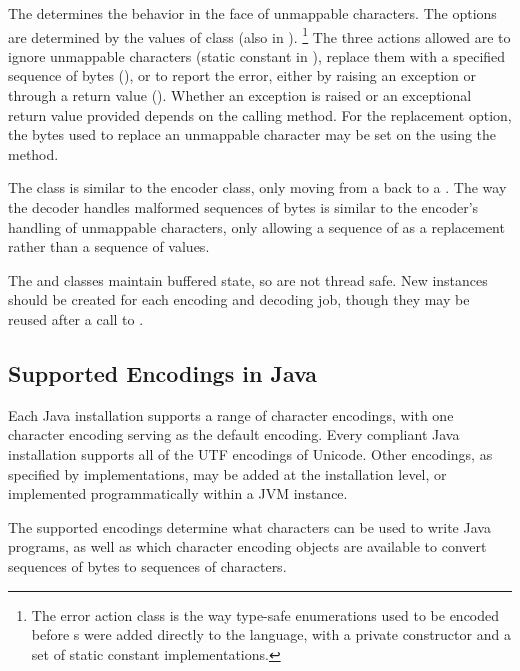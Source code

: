 The  determines the behavior in the face of
unmappable characters.  The options are determined by the values of
class  (also in ).%
%
\footnote{The error action class is the way type-safe enumerations used to
be encoded before s were added directly to the language, with
a private constructor and a set of static constant implementations.}%
%
The three actions allowed are to ignore unmappable characters (static
constant  in ), replace them with
a specified sequence of bytes (), or to report the
error, either by raising an exception or through a return value
().  Whether an exception is raised or an exceptional return
value provided depends on the calling method.  For the replacement option,
the bytes used to replace an unmappable character may be set on the
 using the  method.

The  class is similar to the encoder class, only
moving from a  back to a .  The way
the decoder handles malformed sequences of bytes is similar to the
encoder's handling of unmappable characters, only allowing a sequence
of  as a replacement rather than a sequence of 
values.

The  and  classes maintain
buffered state, so are not thread safe.  New instances should be
created for each encoding and decoding job, though they may be reused
after a call to .



\subsection{Supported Encodings in Java}\label{section:supported-encodings}

Each Java installation supports a range of character encodings, with
one character encoding serving as the default encoding.  Every
compliant Java installation supports all of the UTF encodings of
Unicode.  Other encodings, as specified by 
implementations, may be added at the installation level, or
implemented programmatically within a JVM instance.

The supported encodings determine what characters can be used to write
Java programs, as well as which character encoding objects are
available to convert sequences of bytes to sequences of characters.

